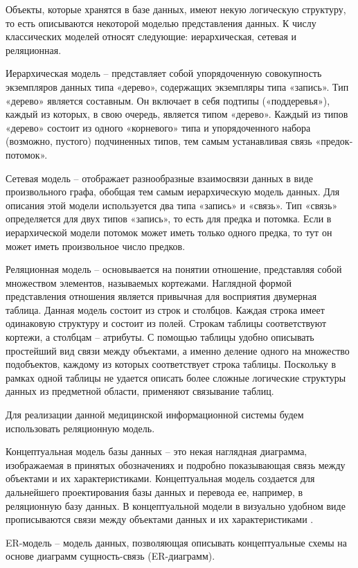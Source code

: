Объекты, которые хранятся в базе данных, имеют некую логическую структуру, то есть описываются некоторой моделью представления данных. К числу классических моделей относят следующие: иерархическая, сетевая и реляционная.

Иерархическая модель – представляет собой упорядоченную совокупность экземпляров данных типа «дерево», содержащих экземпляры типа «запись». Тип «дерево» является составным. Он включает в себя подтипы («поддеревья»), каждый из которых, в свою очередь, является типом «дерево». Каждый из типов «дерево» состоит из одного «корневого» типа и упорядоченного набора (возможно, пустого) подчиненных типов, тем самым устанавливая связь «предок-потомок».

Сетевая модель – отображает разнообразные взаимосвязи данных в виде произвольного графа, обобщая тем самым иерархическую модель данных. Для описания этой модели используется два типа «запись» и «связь». Тип «связь» определяется для двух типов «запись», то есть для предка и потомка. Если в иерархической модели потомок может иметь только одного предка, то тут он может иметь произвольное число предков.

Реляционная модель – основывается на понятии отношение, представляя собой множеством элементов, называемых кортежами. Наглядной формой представления отношения является привычная для восприятия двумерная таблица. Данная модель состоит из строк и столбцов. Каждая строка имеет одинаковую структуру и состоит из полей. Строкам таблицы соответствуют кортежи, а столбцам – атрибуты. С помощью таблицы удобно описывать простейший вид связи между объектами, а именно деление одного на множество подобъектов, каждому из которых соответствует строка таблицы. Поскольку в рамках одной таблицы не удается описать более сложные логические структуры данных из предметной области, применяют связывание таблиц.

Для реализации данной медицинской информационной системы будем использовать реляционную модель.

Концептуальная модель базы данных – это некая наглядная диаграмма, изображаемая в принятых обозначениях и подробно показывающая связь между объектами и их характеристиками. Концептуальная модель создается для дальнейшего проектирования базы данных и перевода ее, например, в реляционную базу данных. В концептуальной модели в визуально удобном виде прописываются связи между объектами данных и их характеристиками \cite{online4}.

ER-модель – модель данных, позволяющая описывать концептуальные схемы на основе диаграмм сущность-связь (ER-диаграмм).

